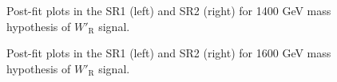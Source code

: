 \begin{figure}[H]
  \centering
  \caption{Post-fit plots in the SR1 (left) and SR2 (right) for 1400 GeV mass hypothesis of $W'_{\text{R}}$ signal.}
  \label{fig:Postfit_WpRH1400_Asimov}
\end{figure}
\begin{figure}[H]
  \centering
  \caption{Post-fit plots in the SR1 (left) and SR2 (right) for 1600 GeV mass hypothesis of $W'_{\text{R}}$ signal.}
  \label{fig:Postfit_WpRH1600_Asimov}
\end{figure}
